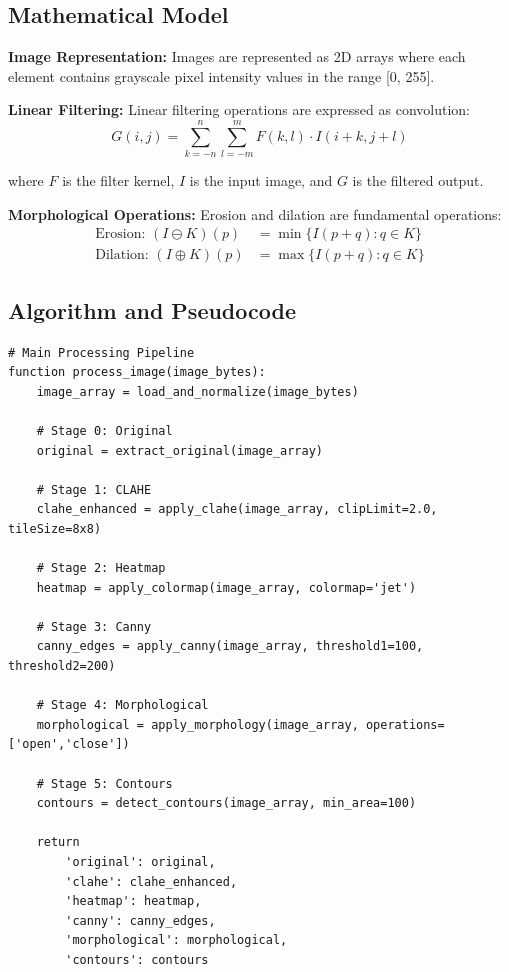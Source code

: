 \documentclass[12pt,a4paper]{article}
\begin{document}
\subsection{Mathematical Model}

\textbf{Image Representation:} Images are represented as 2D arrays where each element contains grayscale pixel intensity values in the range [0, 255].

\textbf{Linear Filtering:} Linear filtering operations are expressed as convolution:
\begin{equation}
G(i,j) = \sum_{k=-n}^{n} \sum_{l=-m}^{m} F(k,l) \cdot I(i+k, j+l)
\end{equation}

where $F$ is the filter kernel, $I$ is the input image, and $G$ is the filtered output.

\textbf{Morphological Operations:} Erosion and dilation are fundamental operations:
\begin{align}
\text{Erosion: } (I \ominus K)(p) &= \min\{I(p+q) : q \in K\} \\
\text{Dilation: } (I \oplus K)(p) &= \max\{I(p+q) : q \in K\}
\end{align}

\subsection{Algorithm and Pseudocode}

\begin{lstlisting}
# Main Processing Pipeline
function process_image(image_bytes):
    image_array = load_and_normalize(image_bytes)
    
    # Stage 0: Original
    original = extract_original(image_array)
    
    # Stage 1: CLAHE
    clahe_enhanced = apply_clahe(image_array, clipLimit=2.0, tileSize=8x8)
    
    # Stage 2: Heatmap
    heatmap = apply_colormap(image_array, colormap='jet')
    
    # Stage 3: Canny
    canny_edges = apply_canny(image_array, threshold1=100, threshold2=200)
    
    # Stage 4: Morphological
    morphological = apply_morphology(image_array, operations=['open','close'])
    
    # Stage 5: Contours
    contours = detect_contours(image_array, min_area=100)
    
    return 
        'original': original,
        'clahe': clahe_enhanced,
        'heatmap': heatmap,
        'canny': canny_edges,
        'morphological': morphological,
        'contours': contours

\end{lstlisting}
\end{document}
